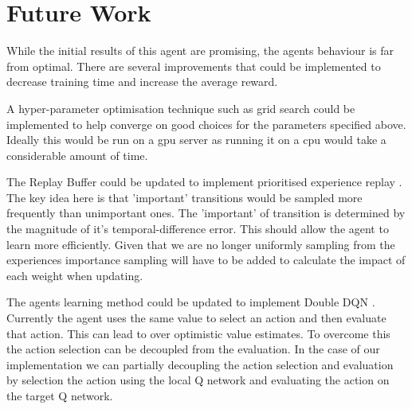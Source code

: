 \documentclass[12pt]{article}
\begin{document}
\section{Future Work}
While the initial results of this agent are promising, the agents behaviour is far from optimal.
There are several improvements that could be implemented to decrease training time and increase the average reward.

A hyper-parameter optimisation technique such as grid search could be implemented to help converge on good choices for the parameters 
specified above. 
Ideally this would be run on a gpu server as running it on a cpu would take a considerable amount of time.

The Replay Buffer could be updated to implement prioritised experience replay \cite{per_paper}. 
The key idea here is that 'important' transitions would be sampled more frequently than unimportant ones. 
The 'important' of transition is determined by the magnitude of it's temporal-difference error.
This should allow the agent to learn more efficiently. 
Given that we are no longer uniformly sampling from the experiences importance sampling will have to be added to calculate the impact of each weight when updating.

The agents learning method could be updated to implement Double DQN \cite{ddqn_paper}. 
Currently the agent uses the same value to select an action and then evaluate that action.
This can lead to over optimistic value estimates.
To overcome this the action selection can be decoupled from the evaluation.
In the case of our implementation we can partially decoupling the action selection and evaluation by selection the action using the local Q network and evaluating the action on the target Q network.

\printbibliography
\end{document}
